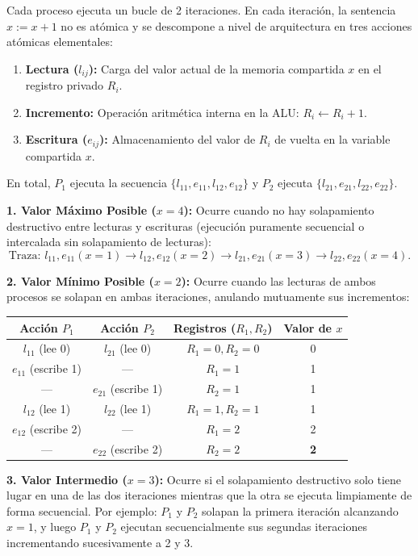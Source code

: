\begin{solucion}
Cada proceso ejecuta un bucle de 2 iteraciones. En cada iteración, la sentencia $x := x + 1$ no es atómica y se descompone a nivel de arquitectura en tres acciones atómicas elementales:
\begin{enumerate}
    \item \textbf{Lectura ($l_{ij}$):} Carga del valor actual de la memoria compartida $x$ en el registro privado $R_i$.
    \item \textbf{Incremento:} Operación aritmética interna en la ALU: $R_i \leftarrow R_i + 1$.
    \item \textbf{Escritura ($e_{ij}$):} Almacenamiento del valor de $R_i$ de vuelta en la variable compartida $x$.
\end{enumerate}
En total, $P_1$ ejecuta la secuencia $\{l_{11}, e_{11}, l_{12}, e_{12}\}$ y $P_2$ ejecuta $\{l_{21}, e_{21}, l_{22}, e_{22}\}$.

\textbf{1. Valor Máximo Posible ($x = 4$):}
Ocurre cuando no hay solapamiento destructivo entre lecturas y escrituras (ejecución puramente secuencial o intercalada sin solapamiento de lecturas):
\[
\text{Traza: } l_{11}, e_{11} (x=1) \to l_{12}, e_{12} (x=2) \to l_{21}, e_{21} (x=3) \to l_{22}, e_{22} (x=4).
\]

\textbf{2. Valor Mínimo Posible ($x = 2$):}
Ocurre cuando las lecturas de ambos procesos se solapan en ambas iteraciones, anulando mutuamente sus incrementos:
\begin{center}
\small
\begin{tabular}{cccc}
\toprule
\textbf{Acción $P_1$} & \textbf{Acción $P_2$} & \textbf{Registros ($R_1, R_2$)} & \textbf{Valor de $x$} \\ \midrule
$l_{11}$ (lee 0) & $l_{21}$ (lee 0) & $R_1=0, R_2=0$ & 0 \\
$e_{11}$ (escribe 1) & --- & $R_1=1$ & 1 \\
--- & $e_{21}$ (escribe 1) & $R_2=1$ & 1 \\
$l_{12}$ (lee 1) & $l_{22}$ (lee 1) & $R_1=1, R_2=1$ & 1 \\
$e_{12}$ (escribe 2) & --- & $R_1=2$ & 2 \\
--- & $e_{22}$ (escribe 2) & $R_2=2$ & \textbf{2} \\ \bottomrule
\end{tabular}
\end{center}

\textbf{3. Valor Intermedio ($x = 3$):}
Ocurre si el solapamiento destructivo solo tiene lugar en una de las dos iteraciones mientras que la otra se ejecuta limpiamente de forma secuencial. Por ejemplo: $P_1$ y $P_2$ solapan la primera iteración alcanzando $x = 1$, y luego $P_1$ y $P_2$ ejecutan secuencialmente sus segundas iteraciones incrementando sucesivamente a 2 y 3.


\end{solucion}
